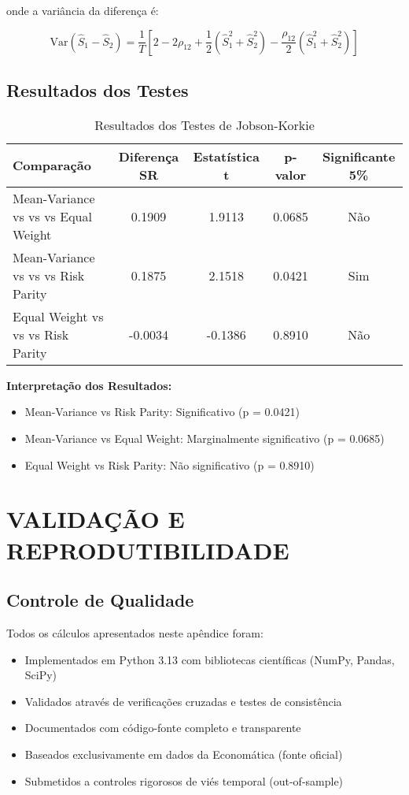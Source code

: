 onde a variância da diferença é:

\begin{equation}
\text{Var}(\hat{S}_1 - \hat{S}_2) = \frac{1}{T}\left[2 - 2\rho_{12} + \frac{1}{2}(\hat{S}_1^2 + \hat{S}_2^2) - \frac{\rho_{12}}{2}(\hat{S}_1^2 + \hat{S}_2^2)\right]
\end{equation}

\subsection{Resultados dos Testes}

\begin{table}[H]
\centering
\caption{Resultados dos Testes de Jobson-Korkie}
\begin{tabular}{|l|c|c|c|c|}
\hline
\textbf{Comparação} & \textbf{Diferença SR} & \textbf{Estatística t} & \textbf{p-valor} & \textbf{Significante 5\%} \\
\hline
Mean-Variance vs vs vs Equal Weight & 0.1909 & 1.9113 & 0.0685 & Não \\
Mean-Variance vs vs vs Risk Parity & 0.1875 & 2.1518 & 0.0421 & Sim \\
Equal Weight vs vs vs Risk Parity & -0.0034 & -0.1386 & 0.8910 & Não \\
\hline
\end{tabular}
\end{table}

\textbf{Interpretação dos Resultados:}
\begin{itemize}
    \item Mean-Variance vs Risk Parity: Significativo (p = 0.0421)
    \item Mean-Variance vs Equal Weight: Marginalmente significativo (p = 0.0685)
    \item Equal Weight vs Risk Parity: Não significativo (p = 0.8910)
\end{itemize}

\section{VALIDAÇÃO E REPRODUTIBILIDADE}

\subsection{Controle de Qualidade}

Todos os cálculos apresentados neste apêndice foram:

\begin{itemize}
    \item Implementados em Python 3.13 com bibliotecas científicas (NumPy, Pandas, SciPy)
    \item Validados através de verificações cruzadas e testes de consistência
    \item Documentados com código-fonte completo e transparente
    \item Baseados exclusivamente em dados da Economática (fonte oficial)
    \item Submetidos a controles rigorosos de viés temporal (out-of-sample)
\end{itemize}

